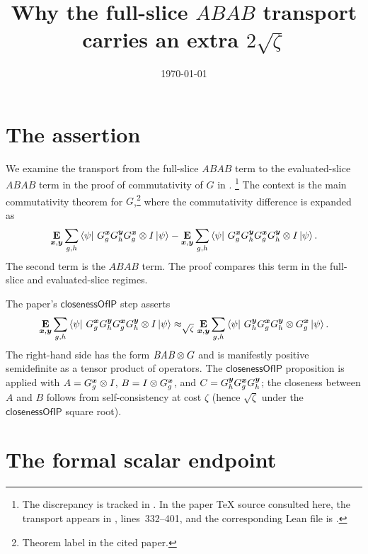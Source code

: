 \documentclass{article}
\title{Why the full-slice $ABAB$ transport carries an extra
$2\sqrt{\zeta}$}
\author{}
\date{\today}
\newcommand{\ABAB}{\textit{ABAB}}
\newcommand{\BAB}{\textit{BAB}}
\newcommand{\closenessOfIP}{\textsf{closenessOfIP}}
\begin{document}
\maketitle

\section{The assertion}

We examine the transport from the full-slice $\ABAB$ term to the
evaluated-slice $\ABAB$ term in the proof of commutativity of $G$ in
\cite[Section~\emph{Commutativity of~$G$}]{Ji2020LowIndividualDegree}.%
\footnote{The discrepancy is tracked in . In the paper
\TeX{} source consulted here, the transport appears in
, lines~332--401, and
the corresponding Lean file is
.}
The context is the main commutativity theorem for $G$,\footnote{Theorem
label  in the cited paper.} where the
commutativity difference is expanded as
\begin{equation}\label{eq:gcomterms}
  \mathop{\bf E\/}_{{\boldsymbol{x}},\boldsymbol{y}} \sum_{g,h}
    \bra{\psi}\, G^{{\boldsymbol{x}}}_g G^{\boldsymbol{y}}_h G^{{\boldsymbol{x}}}_g \otimes I \ket{\psi}
  - 
  \mathop{\bf E\/}_{{\boldsymbol{x}},\boldsymbol{y}} \sum_{g,h}
    \bra{\psi}\, G^{{\boldsymbol{x}}}_g G^{\boldsymbol{y}}_h G^{{\boldsymbol{x}}}_g G^{\boldsymbol{y}}_h \otimes I \ket{\psi}.
\end{equation}
The second term is the $\ABAB$ term. The proof compares this term in
the full-slice and evaluated-slice regimes.

The paper's $\closenessOfIP$ step asserts
\begin{equation}\label{eq:gcom4}
  \mathop{\bf E\/}_{{\boldsymbol{x}},\boldsymbol{y}} \sum_{g,h}
    \bra{\psi}\, G^{{\boldsymbol{x}}}_g G^{\boldsymbol{y}}_h G^{{\boldsymbol{x}}}_g G^{\boldsymbol{y}}_h \otimes I \ket{\psi}
  \approx_{\sqrt{\zeta}} 
  \mathop{\bf E\/}_{{\boldsymbol{x}},\boldsymbol{y}} \sum_{g,h}
    \bra{\psi}\, G^{\boldsymbol{y}}_h G^{{\boldsymbol{x}}}_g G^{\boldsymbol{y}}_h \otimes G^{{\boldsymbol{x}}}_g \ket{\psi}.
\end{equation}
The right-hand side has the form $\BAB \ot G$ and is manifestly
positive semidefinite as a tensor product of operators. The
$\closenessOfIP$ proposition is applied with $A = G^{{\boldsymbol{x}}}_g \otimes I$,
$B = I \otimes G^{{\boldsymbol{x}}}_g$, and $C = G^{\boldsymbol{y}}_h G^{{\boldsymbol{x}}}_g G^{\boldsymbol{y}}_h$; the
closeness between $A$ and $B$ follows from self-consistency at cost
$\zeta$ (hence $\sqrt{\zeta}$ under the $\closenessOfIP$ square root).

\section{The formal scalar endpoint}
\end{document}
